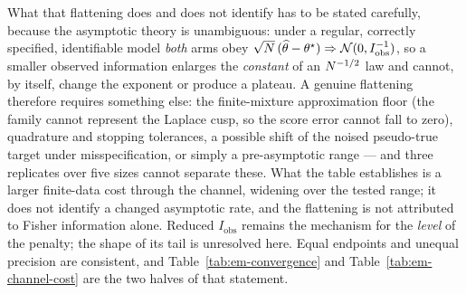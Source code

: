 What that flattening does and does not identify has to be stated carefully,
because the asymptotic theory is unambiguous: under a regular, correctly
specified, identifiable model \emph{both} arms obey
$\sqrt{N}\,(\widehat\theta - \theta^\star) \Rightarrow
\mathcal{N}(0, I_{\mathrm{obs}}^{-1})$, so a smaller observed information enlarges
the \emph{constant} of an $N^{-1/2}$ law and cannot, by itself, change
the exponent or produce a plateau. A genuine flattening therefore requires
something else: the finite-mixture approximation floor (the family cannot
represent the Laplace cusp, so the score error cannot fall to zero),
quadrature and stopping tolerances, a possible shift of the noised
pseudo-true target under misspecification, or simply a pre-asymptotic range
--- and three replicates over five sizes cannot separate these. What the
table establishes is a larger finite-data cost through the channel, widening
over the tested range; it does not identify a changed asymptotic rate, and
the flattening is not attributed to Fisher information alone. Reduced
$I_{\mathrm{obs}}$ remains the mechanism for the \emph{level} of the
penalty; the shape of its tail is unresolved here. Equal endpoints
and unequal precision are consistent, and Table~\ref{tab:em-convergence} and
Table~\ref{tab:em-channel-cost} are the two halves of that statement.
